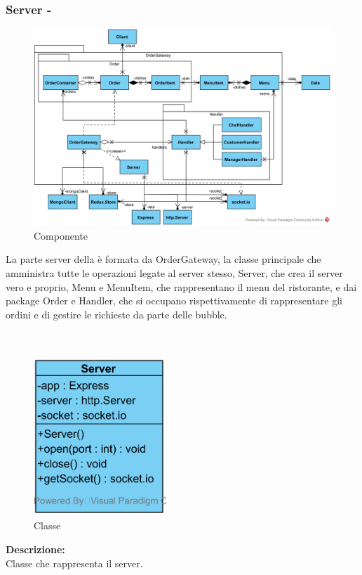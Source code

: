 \subsubsection{Server - \class}
\begin{figure}[H]
	\centering
	\includegraphics[width=15cm]{./diagrammi/demo/server/ordergatewaypkg.png}
	\caption{Componente \class}
\end{figure}
La parte server della \DemoName{} è formata da OrderGateway, la classe principale che amministra tutte le operazioni legate al server stesso, Server, che crea il server vero e proprio, Menu e MenuItem, che rappresentano il menu del ristorante, e dai package Order e Handler, che si occupano rispettivamente di rappresentare gli ordini e di gestire le richieste da parte delle bubble. 

\paragraph[::Server]{\class}\mbox{}\\ \label{\class}
\begin{figure}[H]
	\centering
		\includegraphics[width=5cm]{./diagrammi/demo/server/server.png}
	\caption{Classe \class}
\end{figure}
\textbf{Descrizione:}\\
Classe che rappresenta il server.

